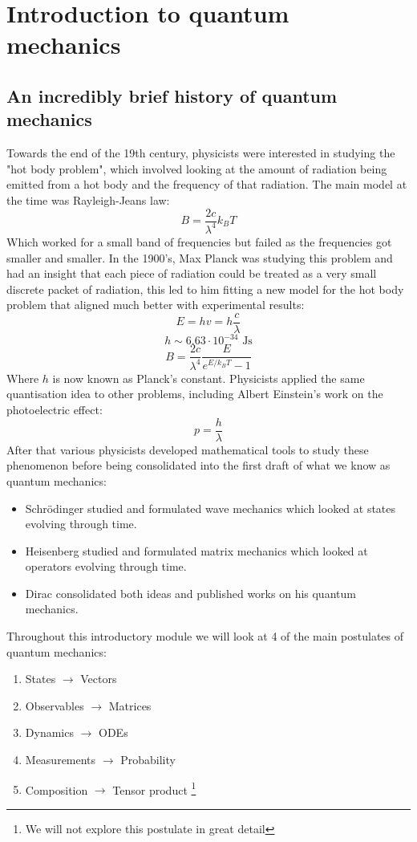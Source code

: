 \documentclass[12pt]{article}
\begin{document}
\section{Introduction to quantum mechanics}
\subsection*{An incredibly brief history of quantum mechanics}
Towards the end of the 19th century, physicists were interested in studying the "hot body problem", which involved looking at the amount of radiation being emitted from a hot body and the frequency of that radiation. The main model at the time was Rayleigh-Jeans law:
\[B=\frac{2c}{\lambda^4}k_BT\]
Which worked for a small band of frequencies but failed as the frequencies got smaller and smaller. In the 1900's, Max Planck was studying this problem and had an insight that each piece of radiation could be treated as a very small discrete packet of radiation, this led to him fitting a new model for the hot body problem that aligned much better with experimental results:
\[E=hv=h\frac{c}{\lambda}\]
\[h\sim 6.63\cdot 10^{-34}\text{ Js}\]
\[B=\frac{2c}{\lambda^4}\frac{E}{e^{E/k_BT}-1}\]
Where \(h\) is now known as Planck's constant. Physicists applied the same quantisation idea to other problems, including Albert Einstein's work on the photoelectric effect:
\[p=\frac{h}{\lambda}\]
After that various physicists developed mathematical tools to study these phenomenon before being consolidated into the first draft of what we know as quantum mechanics:
\begin{itemize}
    \item Schrödinger studied and formulated wave mechanics which looked at states evolving through time.
    \item Heisenberg studied and formulated matrix mechanics which looked at operators evolving through time.
    \item Dirac consolidated both ideas and published works on his quantum mechanics.
\end{itemize}
Throughout this introductory module we will look at 4 of the main postulates of quantum mechanics:
\begin{enumerate}
    \item States \(\longrightarrow\) Vectors
    \item Observables \(\longrightarrow\) Matrices
    \item Dynamics \(\longrightarrow\) ODEs
    \item Measurements \(\longrightarrow\) Probability
    \item Composition \(\longrightarrow\) Tensor product \footnote{We will not explore this postulate in great detail}
\end{enumerate}
\end{document}
